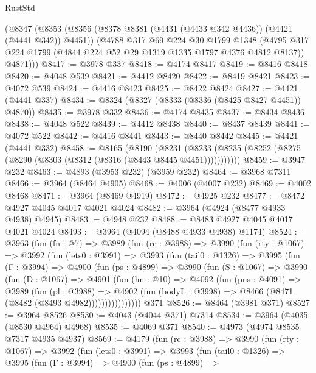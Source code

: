 \begin{lexlean}{RustStd}
\begin{coremodule}
{\begin{coremodule}
{{{{{{{{{{{{{{{{{{{{{{{{{{{{{{{{{{{{{{    (@8347
      (@8353
        (@8356 (@8378 @8381 (@4431 (@4433 @342 @4436)) (@4421 (@4441 @342)) @4451))
        (@4788
          @317
          @69
          @224
          @30
          @1799
          @1348
          (@4795 @317 @224 @1799 (@4844 @224 @52 @29 @1319 @1335 @1797 @4376 @4812 @8137))
          @4871)))
@8417 := @3978 @337
@8418 := @4174 @8417
@8419 := @8416 @8418
@8420 := @4048 @539
@8421 := @4412 @8420
@8422 := @8419 @8421
@8423 := @4072 @539
@8424 := @4416 @8423
@8425 := @8422 @8424
@8427 := @4421 (@4441 @337)
@8434 := @8324 (@8327 (@8333 (@8336 (@8425 @8427 @4451)) @4870))
@8435 := @3978 @332
@8436 := @4174 @8435
@8437 := @8434 @8436
@8438 := @4048 @522
@8439 := @4412 @8438
@8440 := @8437 @8439
@8441 := @4072 @522
@8442 := @4416 @8441
@8443 := @8440 @8442
@8445 := @4421 (@4441 @332)
@8458 := @8165
    (@8190
      (@8231 (@8233 (@8235 (@8252 (@8275 (@8290 (@8303 (@8312 (@8316 (@8443 @8445 @4451)))))))))))
@8459 := @3947 @232
@8463 := @4893 (@3953 @232) (@3959 @232)
@8464 := @3968 @7311
@8466 := @3964 (@8464 @4905)
@8468 := @4006 (@4007 @232)
@8469 := @4002 @8468
@8471 := @3964 (@8469 @4919)
@8472 := @4925 @232
@8477 := @8472 @4927 @4045 @4017 @4021 @4024
@8482 := @3964 (@4924 (@8477 @4933 @4938) @4945)
@8483 := @4948 @232
@8488 := @8483 @4927 @4045 @4017 @4021 @4024
@8493 := @3964 (@4094 (@8488 @4933 @4938) @1174)
@8524 := @3963
    (fun (fn : @7) =>
    @3989
      (fun (rc : @3988) =>
      @3990
        (fun (rty : @1067) =>
        @3992
          (fun (lets0 : @3991) =>
          @3993
            (fun (tail0 : @1326) =>
            @3995
              (fun (Γ : @3994) =>
              @4900
                (fun (ps : @4899) =>
                @3990
                  (fun (S : @1067) =>
                  @3990
                    (fun (D : @1067) =>
                    @4901
                      (fun (hn : @10) =>
                      @4092
                        (fun (pns : @4091) =>
                        @3989
                          (fun (pl : @3988) =>
                          @4902
                            (fun (bodyL : @3998) => @8466 (@8471 (@8482 (@8493 @4982))))))))))))))))
    @371
@8526 := @8464 (@3981 @371)
@8527 := @3964 @8526
@8530 := @4043 (@4044 @371) @7314
@8534 := @3964 (@4035 (@8530 @4964) @4968)
@8535 := @4069 @371
@8540 := @4973 (@4974 @8535 @7317 @4935 @4937)
@8569 := @4179
    (fun (rc : @3988) =>
    @3990
      (fun (rty : @1067) =>
      @3992
        (fun (lets0 : @3991) =>
        @3993
          (fun (tail0 : @1326) =>
          @3995
            (fun (Γ : @3994) =>
            @4900
              (fun (ps : @4899) =>
}}}}}}}}}}}}}}}}}}}}}}}}}}}}}}}}}}}}}}
\end{coremodule}}
\end{coremodule}
\end{lexlean}
